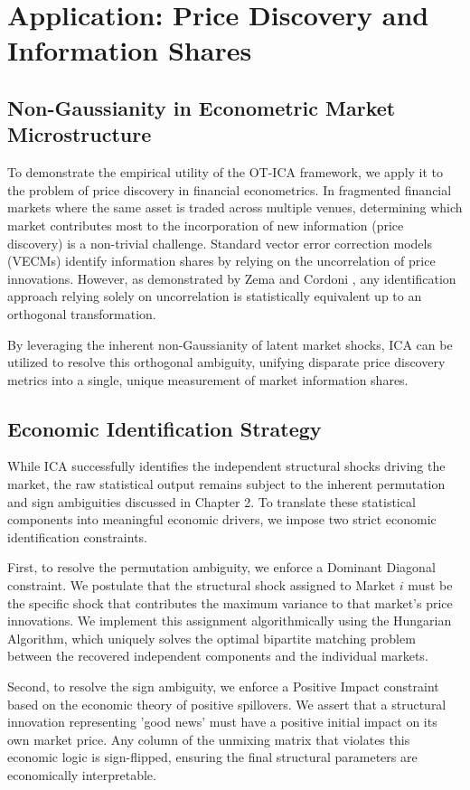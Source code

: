 \documentclass[12pt,a4paper,twoside,openany]{book}
\begin{document}
\section{Application: Price Discovery and Information Shares}

\subsection{Non-Gaussianity in Econometric Market Microstructure}
To demonstrate the empirical utility of the OT-ICA framework, we apply it to the problem of price discovery in financial econometrics. 
In fragmented financial markets where the same asset is traded across multiple venues, 
determining which market contributes most to the incorporation of new information (price discovery) is a non-trivial challenge. 
Standard vector error correction models (VECMs) identify information shares by relying on the uncorrelation of price innovations. 
However, as demonstrated by Zema and Cordoni \citeyear{zema2025}, any identification approach relying solely on uncorrelation is statistically equivalent up to an orthogonal transformation. 

By leveraging the inherent non-Gaussianity of latent market shocks, ICA can be utilized to resolve this orthogonal ambiguity, 
unifying disparate price discovery metrics into a single, unique measurement of market information shares. 

\subsection{Economic Identification Strategy}
While ICA successfully identifies the independent structural shocks driving the market, the raw statistical output remains subject to the inherent permutation and sign ambiguities 
discussed in Chapter 2. To translate these statistical components into meaningful economic drivers, we impose two strict economic identification constraints.

First, to resolve the permutation ambiguity, we enforce a Dominant Diagonal constraint. 
We postulate that the structural shock assigned to Market $i$ must be the specific shock that contributes the maximum variance to that market's price innovations. 
We implement this assignment algorithmically using the Hungarian Algorithm, which uniquely solves the optimal bipartite matching problem between the recovered independent components 
and the individual markets.

Second, to resolve the sign ambiguity, we enforce a Positive Impact constraint based on the economic theory of positive spillovers. 
We assert that a structural innovation representing 'good news' must have a positive initial impact on its own market price. 
Any column of the unmixing matrix that violates this economic logic is sign-flipped, ensuring the final structural parameters are economically interpretable. 
\end{document}
